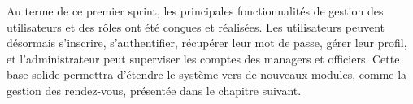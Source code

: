 Au terme de ce premier sprint, les principales fonctionnalités de gestion des utilisateurs et des rôles ont été conçues et réalisées. Les utilisateurs peuvent désormais s’inscrire, s’authentifier, récupérer leur mot de passe, gérer leur profil, et l’administrateur peut superviser les comptes des managers et officiers. Cette base solide permettra d’étendre le système vers de nouveaux modules, comme la gestion des rendez-vous, présentée dans le chapitre suivant.
\label{sec_Conclusion}
